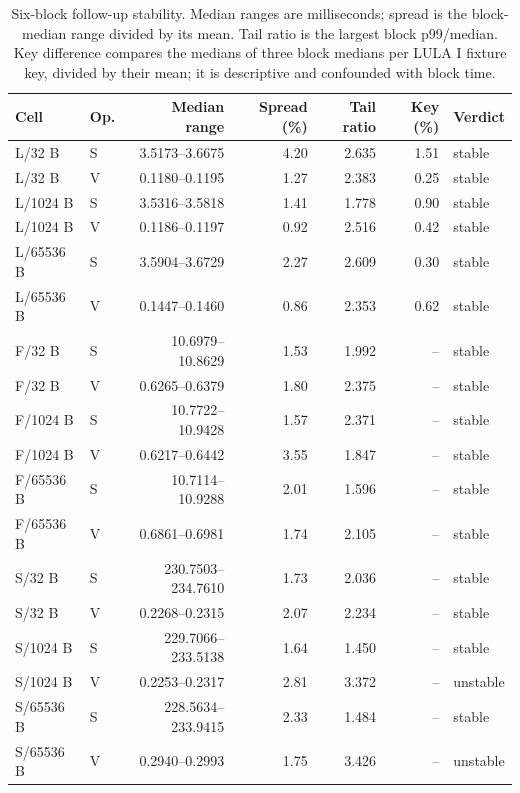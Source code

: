 \begin{table}[t]
\caption{Six-block follow-up stability. Median ranges are milliseconds; spread is the block-median range divided by its mean. Tail ratio is the largest block p99/median. Key difference compares the medians of three block medians per LULA I fixture key, divided by their mean; it is descriptive and confounded with block time.}\label{tab:stability-verdicts}
\centering\small\setlength{\tabcolsep}{3pt}
\begin{tabular}{llrrrrl}\toprule
Cell & Op. & Median range & Spread (\%) & Tail ratio & Key (\%) & Verdict\\\midrule
L/32 B & S & 3.5173--3.6675 & 4.20 & 2.635 & 1.51 & stable\\
L/32 B & V & 0.1180--0.1195 & 1.27 & 2.383 & 0.25 & stable\\
L/1024 B & S & 3.5316--3.5818 & 1.41 & 1.778 & 0.90 & stable\\
L/1024 B & V & 0.1186--0.1197 & 0.92 & 2.516 & 0.42 & stable\\
L/65536 B & S & 3.5904--3.6729 & 2.27 & 2.609 & 0.30 & stable\\
L/65536 B & V & 0.1447--0.1460 & 0.86 & 2.353 & 0.62 & stable\\
F/32 B & S & 10.6979--10.8629 & 1.53 & 1.992 & -- & stable\\
F/32 B & V & 0.6265--0.6379 & 1.80 & 2.375 & -- & stable\\
F/1024 B & S & 10.7722--10.9428 & 1.57 & 2.371 & -- & stable\\
F/1024 B & V & 0.6217--0.6442 & 3.55 & 1.847 & -- & stable\\
F/65536 B & S & 10.7114--10.9288 & 2.01 & 1.596 & -- & stable\\
F/65536 B & V & 0.6861--0.6981 & 1.74 & 2.105 & -- & stable\\
S/32 B & S & 230.7503--234.7610 & 1.73 & 2.036 & -- & stable\\
S/32 B & V & 0.2268--0.2315 & 2.07 & 2.234 & -- & stable\\
S/1024 B & S & 229.7066--233.5138 & 1.64 & 1.450 & -- & stable\\
S/1024 B & V & 0.2253--0.2317 & 2.81 & 3.372 & -- & unstable\\
S/65536 B & S & 228.5634--233.9415 & 2.33 & 1.484 & -- & stable\\
S/65536 B & V & 0.2940--0.2993 & 1.75 & 3.426 & -- & unstable\\
\bottomrule\end{tabular}
\end{table}

